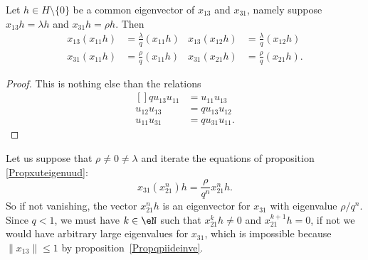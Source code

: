 \begin{proposition}     \label{Propxuteigenuud}
	Let \( h\in H\setminus\{ 0 \}\) be a common eigenvector of \( x_{13}\) and \( x_{31}\), namely suppose \( x_{13}h=\lambda h\) and \( x_{31}h=\rho h\). Then
	\begin{subequations}
		\begin{align}
			x_{13}(x_{11}h) & =\frac{ \lambda }{ q }(x_{11}h) & x_{13}(x_{12}h) & =\frac{ \lambda }{ q }(x_{12}h) \\
			x_{31}(x_{11}h) & =\frac{\rho}{ q }(x_{11}h)      & x_{31}(x_{21}h) & =\frac{\rho}{ q }(x_{21}h).
		\end{align}
	\end{subequations}

\end{proposition}

\begin{proof}
	This is nothing else than the relations
	\begin{equation}
		\begin{aligned}[]
			qu_{13}u_{11} & =u_{11}u_{13}   \\
			u_{12}u_{13}  & =qu_{13}u_{12}  \\
			u_{11}u_{31}  & =qu_{31}u_{11}.
		\end{aligned}
	\end{equation}
\end{proof}

Let us suppose that \( \rho\neq 0\neq\lambda\) and iterate the equations of proposition \eqref{Propxuteigenuud}:
\begin{equation}
	x_{31}(x_{21}^n)h=\frac{ \rho }{ q^n }x_{21}^nh.
\end{equation}
So if not vanishing, the vector \( x_{21}^nh\) is an eigenvector for \( x_{31}\) with eigenvalue \( \rho/q^n\). Since \( q<1\), we must have \( k\in\eN\) such that \( x_{21}^kh\neq 0\) and \( x_{21}^{k+1}h=0\), if not we would have arbitrary large eigenvalues for \( x_{31}\), which is impossible because \( \| x_{13} \|\leq 1\) by proposition~\ref{Propqpiideinve}.

